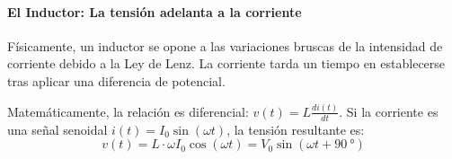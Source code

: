 \begin{marginfigure}
    \centering
    \shorthandoff{>}
    \caption[Representación temporal del desfase en un inductor ideal.]{Representación temporal del desfase en un inductor ideal. La curva de tensión (roja) alcanza su valor máximo un cuarto de ciclo antes que la de corriente (azul).}\label{fig:fase_temporal}
\end{marginfigure}

\paragraph{El Inductor: La tensión adelanta a la corriente}
Físicamente, un inductor se opone a las variaciones bruscas de la intensidad de corriente debido a la Ley de Lenz. La corriente tarda un tiempo en establecerse tras aplicar una diferencia de potencial. 

Matemáticamente, la relación es diferencial: $v(t) = L \frac{di(t)}{dt}$. Si la corriente es una señal senoidal $i(t) = I_0 \sin(\omega t)$, la tensión resultante es:
\begin{equation}
    v(t) = L \cdot \omega I_0 \cos(\omega t) = V_0 \sin(\omega t + \qty{90}{\degree})
\end{equation}


